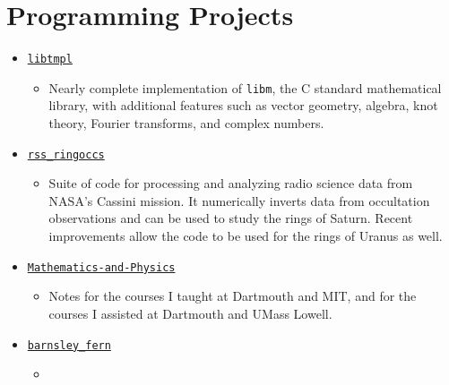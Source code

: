 \documentclass[letterpaper,sans]{moderncv}
\begin{document}
    \section{Programming Projects}
        \begin{itemize}
            \item
                \href{https://github.com/ryanmaguire/libtmpl/}{\texttt{libtmpl}}
                \begin{itemize}
                    \item
                        Nearly complete implementation of \texttt{libm}, the
                        C standard mathematical library, with additional
                        features such as vector geometry, algebra, knot theory,
                        Fourier transforms, and complex numbers.
                \end{itemize}
            \item
                \href{%
                    https://github.com/NASA-Planetary-Science/rss_ringoccs/%
                }{\texttt{rss\_ringoccs}}
                \begin{itemize}
                    \item
                        Suite of code for processing and analyzing radio
                        science data from NASA's Cassini mission. It
                        numerically inverts data from occultation
                        observations and can be used to study the rings of
                        Saturn. Recent improvements allow the code to be used
                        for the rings of Uranus as well.
                \end{itemize}
            \item
                \href{%
                    https://github.com/ryanmaguire/Mathematics-and-Physics/%
                }{\texttt{Mathematics-and-Physics}}
                \begin{itemize}
                    \item
                        Notes for the courses I taught at Dartmouth and MIT,
                        and for the courses I assisted at Dartmouth and
                        UMass Lowell.
                \end{itemize}
            \item
                \href{%
                    https://github.com/ryanmaguire/barnsley_fern/%
                }{\texttt{barnsley\_fern}}
                \begin{itemize}
                    \item

\end{itemize}
\end{itemize}
\end{document}
